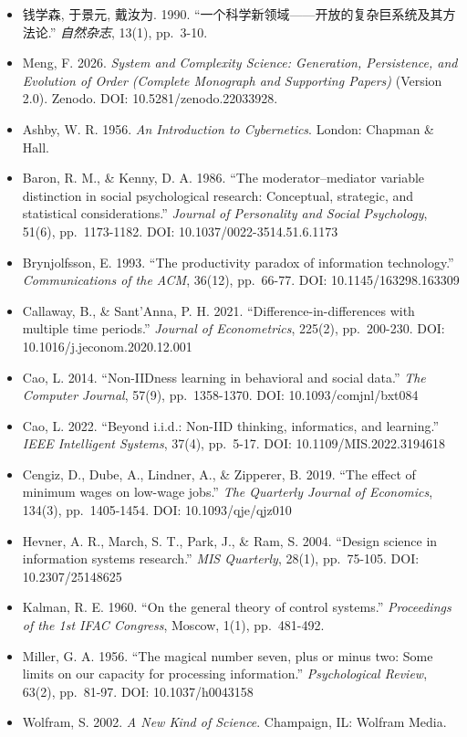 \documentclass[
]{article}
\providecommand{\tightlist}{%
  \setlength{\itemsep}{0pt}\setlength{\parskip}{0pt}}
\begin{document}
\begin{itemize}
\tightlist
\item
  钱学森, 于景元, 戴汝为. 1990.
  ``一个科学新领域------开放的复杂巨系统及其方法论.'' \emph{自然杂志},
  13(1), pp.~3-10.
\item
  Meng, F. 2026. \emph{System and Complexity Science: Generation,
  Persistence, and Evolution of Order (Complete Monograph and Supporting
  Papers)} (Version 2.0). Zenodo. DOI: 10.5281/zenodo.22033928.
\item
  Ashby, W. R. 1956. \emph{An Introduction to Cybernetics}. London:
  Chapman \& Hall.
\item
  Baron, R. M., \& Kenny, D. A. 1986. ``The moderator--mediator variable
  distinction in social psychological research: Conceptual, strategic,
  and statistical considerations.'' \emph{Journal of Personality and
  Social Psychology}, 51(6), pp.~1173-1182. DOI:
  10.1037/0022-3514.51.6.1173
\item
  Brynjolfsson, E. 1993. ``The productivity paradox of information
  technology.'' \emph{Communications of the ACM}, 36(12), pp.~66-77.
  DOI: 10.1145/163298.163309
\item
  Callaway, B., \& Sant'Anna, P. H. 2021. ``Difference-in-differences
  with multiple time periods.'' \emph{Journal of Econometrics}, 225(2),
  pp.~200-230. DOI: 10.1016/j.jeconom.2020.12.001
\item
  Cao, L. 2014. ``Non-IIDness learning in behavioral and social data.''
  \emph{The Computer Journal}, 57(9), pp.~1358-1370. DOI:
  10.1093/comjnl/bxt084
\item
  Cao, L. 2022. ``Beyond i.i.d.: Non-IID thinking, informatics, and
  learning.'' \emph{IEEE Intelligent Systems}, 37(4), pp.~5-17. DOI:
  10.1109/MIS.2022.3194618
\item
  Cengiz, D., Dube, A., Lindner, A., \& Zipperer, B. 2019. ``The effect
  of minimum wages on low-wage jobs.'' \emph{The Quarterly Journal of
  Economics}, 134(3), pp.~1405-1454. DOI: 10.1093/qje/qjz010
\item
  Hevner, A. R., March, S. T., Park, J., \& Ram, S. 2004. ``Design
  science in information systems research.'' \emph{MIS Quarterly},
  28(1), pp.~75-105. DOI: 10.2307/25148625
\item
  Kalman, R. E. 1960. ``On the general theory of control systems.''
  \emph{Proceedings of the 1st IFAC Congress}, Moscow, 1(1),
  pp.~481-492.
\item
  Miller, G. A. 1956. ``The magical number seven, plus or minus two:
  Some limits on our capacity for processing information.''
  \emph{Psychological Review}, 63(2), pp.~81-97. DOI: 10.1037/h0043158
\item
  Wolfram, S. 2002. \emph{A New Kind of Science}. Champaign, IL: Wolfram
  Media.
\end{itemize}
\end{document}
